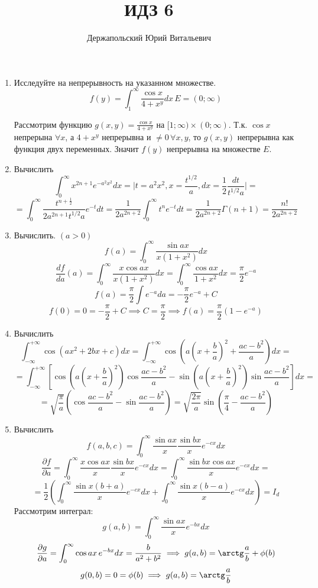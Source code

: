 \documentclass{article}
\title{ИДЗ 6}
\author{Держапольский Юрий Витальевич}
\date{}
\newcommand{\minf}{{-\infty}}
\newcommand{\pinf}{{+\infty}}
\begin{document}
\begin{large}
\maketitle

\begin{enumerate}

\item Исследуйте на непрерывность на указанном множестве.
$$ f(y) = \int_1^\infty \frac{\cos x}{4 +x^y} dx \, E = (0; \infty)$$

Рассмотрим функцию $ g(x,y) = \frac{\cos x}{4 +x^y} $ на $[1;\infty) \times (0; \infty)$. Т.к. $\cos x$ непрерына $\forall x$, а $4 + x^y$ непрерывна и $\neq 0\, \forall x, y$,
то $g(x,y)$ непрерывна как функция двух переменных.
Значит $f(y)$ непрерывна на множестве $E$.

\item Вычислить
$$ \int_0^\infty x^{2n+1} e^{-a^2x^2} dx = \Big| t = a^2x^2, x = \frac{t^{1/2}}{a}, dx = \frac{1}{2}\frac{dt}{t^{1/2}a} \Big| = $$
$$ = \int_0^\infty \frac{t^{n+\frac{1}{2}}}{2a^{2n+1}t^{1/2}a} e^{-t} dt = \frac{1}{2a^{2n+2}} \int_0^\infty t^n e^{-t} dt = \frac{1}{2a^{2n+2}} \Gamma(n+1) = \frac{n!}{2a^{2n+2}} $$

\item Вычислить. $(a > 0)$
$$ f(a) = \int_0^\infty \frac{\sin ax}{x (1+x^2)} dx $$
$$ \frac{df}{da}(a) = \int_0^\infty \frac{x\cos ax }{x(1+x^2)}dx = \int_0^\infty \frac{\cos ax }{1+x^2} dx = \frac{\pi}{2}e^{-a}$$
$$ f(a) = \frac{\pi}{2} \int e^{-a} da = -\frac{\pi}{2} e^{-a} + C$$
$$ f(0) = 0 = -\frac{\pi}{2} + C \implies C = \frac{\pi}{2} \implies f(a) = \frac{\pi}{2}(1-e^{-a})$$

\item Вычислить
$$ \int_{-\infty}^{+\infty} \cos (ax^2 + 2bx + c) dx = \int_\minf^\pinf \cos \left( a \left( x + \frac{b}{a} \right)^2 + \frac{ac - b^2}{a} \right) dx = $$
$$ = \int_\minf^\pinf \left[ \cos \left( a \left( x + \frac{b}{a} \right)^2 \right) \cos \frac{ac-b^2}{a} - \sin \left( a \left( x + \frac{b}{a} \right)^2 \right) \sin \frac{ac-b^2}{a} \right] dx = $$
$$ = \sqrt{\frac{\pi}{a}} \left( \cos \frac{ac-b^2}{a} - \sin \frac{ac-b^2}{a} \right) = \sqrt{\frac{2\pi}{a}} \sin \left( \frac{\pi}{4} - \frac{ac-b^2}{a} \right) $$

\item Вычислить
$$ f(a,b,c) = \int_0^\infty \frac{\sin ax}{x} \frac{\sin bx}{x} e^{-cx} dx $$
$$ \frac{\partial f}{\partial a} = \int_0^\infty \frac{x\cos ax}{x} \frac{\sin bx}{x} e^{-cx} dx = \int_0^\infty \frac{\sin bx \cos ax}{x} e^{-cx} dx =$$
$$= \frac{1}{2} \left( \int_0^\infty \frac{\sin x(b+a)}{x} e^{-cx} dx + \int_0^\infty \frac{\sin x(b-a)}{x} e^{-cx} dx \right) = I_d$$
Рассмотрим интеграл:
$$ g(a,b) = \int_0^\infty \frac{\sin ax}{x} e^{-bx} dx $$
$$ \frac{\partial g}{\partial a} = \int_0^\infty \cos ax \, e^{-bx} dx = \frac{b}{a^2 + b^2} \implies g(a,b) = \arctg \frac{a}{b} + \phi(b) $$
$$ g(0,b) = 0 = \phi(b) \implies g(a,b) = \arctg \frac{a}{b} $$


\end{enumerate}
\end{large}
\end{document}
